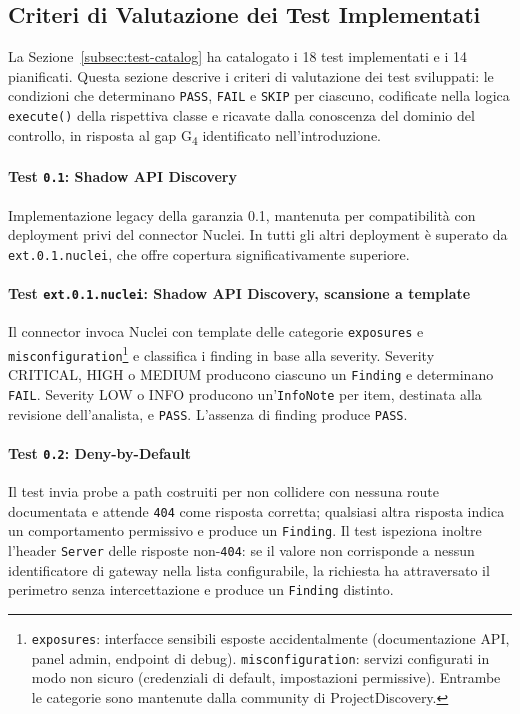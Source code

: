 \subsection{Criteri di Valutazione dei Test Implementati}\label{subsec:test-oracles}

La Sezione~\ref{subsec:test-catalog} ha catalogato i 18 test implementati e i 14 pianificati. Questa sezione descrive i criteri di valutazione dei test sviluppati: le condizioni che determinano \texttt{PASS}, \texttt{FAIL} e \texttt{SKIP} per ciascuno, codificate nella logica \texttt{execute()} della rispettiva classe e ricavate dalla conoscenza del dominio del controllo, in risposta al gap G\textsubscript{4} identificato nell'introduzione.

\paragraph{Test \texttt{0.1}: Shadow API Discovery}
Implementazione legacy della garanzia 0.1, mantenuta per compatibilità con deployment privi del connector Nuclei. In tutti gli altri deployment è superato da \texttt{ext.0.1.nuclei}, che offre copertura significativamente superiore.

\paragraph{Test \texttt{ext.0.1.nuclei}: Shadow API Discovery, scansione a template}
Il connector invoca Nuclei con template delle categorie \texttt{exposures} e \texttt{misconfiguration}\footnote{\texttt{exposures}: interfacce sensibili esposte accidentalmente (documentazione \gls{API}, panel admin, endpoint di debug). \texttt{misconfiguration}: servizi configurati in modo non sicuro (credenziali di default, impostazioni permissive). Entrambe le categorie sono mantenute dalla community di ProjectDiscovery.} e classifica i finding in base alla severity. Severity CRITICAL, HIGH o MEDIUM producono ciascuno un \texttt{Finding} e determinano \texttt{FAIL}. Severity LOW o INFO producono un'\texttt{InfoNote} per item, destinata alla revisione dell'analista, e \texttt{PASS}. L'assenza di finding produce \texttt{PASS}.

\paragraph{Test \texttt{0.2}: Deny-by-Default}
Il test invia probe a path costruiti per non collidere con nessuna route documentata e attende \texttt{404} come risposta corretta; qualsiasi altra risposta indica un comportamento permissivo e produce un \texttt{Finding}. Il test ispeziona inoltre l'header \texttt{Server} delle risposte non-\texttt{404}: se il valore non corrisponde a nessun identificatore di gateway nella lista configurabile, la richiesta ha attraversato il perimetro senza intercettazione e produce un \texttt{Finding} distinto.


